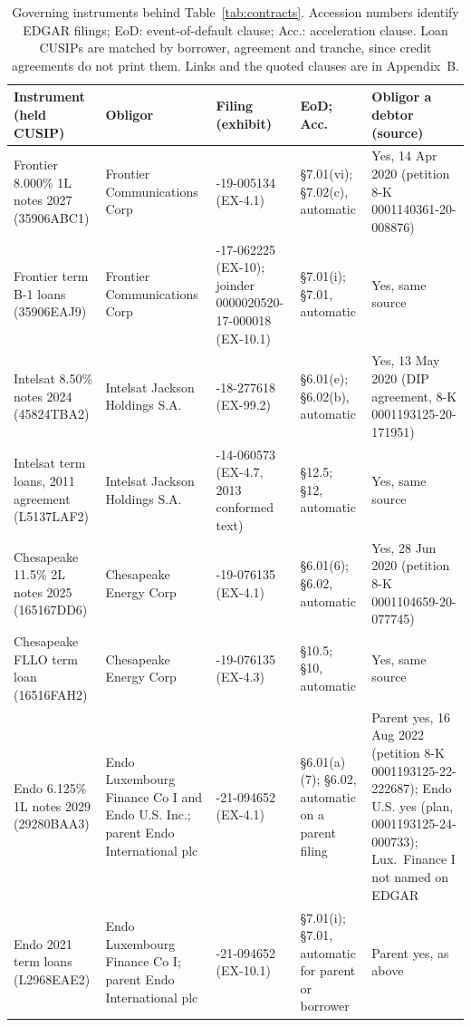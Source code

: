 \documentclass[11pt]{article}
\begin{document}
\begin{table}[H]
\centering\footnotesize
\caption{Governing instruments behind Table~\ref{tab:contracts}. Accession numbers identify EDGAR filings; EoD: event-of-default
clause; Acc.: acceleration clause. Loan CUSIPs are matched by borrower, agreement and tranche, since
credit agreements do not print them. Links and the quoted clauses are in Appendix~B.}\label{tab:sources}
\begin{tabularx}{\textwidth}{@{}>{\raggedright\arraybackslash}p{2.9cm} >{\raggedright\arraybackslash}p{2.6cm} >{\raggedright\arraybackslash}X >{\raggedright\arraybackslash}p{2.1cm} >{\raggedright\arraybackslash}X@{}}
\toprule
Instrument (held CUSIP) & Obligor & Filing (exhibit) & EoD; Acc. & Obligor a debtor (source) \\
\midrule
Frontier 8.000\% 1L notes 2027 (35906ABC1) & Frontier Communications Corp & 0001140361-19-005134 (EX-4.1) & \S7.01(vi); \S7.02(c), automatic & Yes, 14 Apr 2020 (petition 8-K 0001140361-20-008876) \\
Frontier term B-1 loans (35906EAJ9) & Frontier Communications Corp & 0001193125-17-062225 (EX-10); joinder 0000020520-17-000018 (EX-10.1) & \S7.01(i); \S7.01, automatic & Yes, same source \\
Intelsat 8.50\% notes 2024 (45824TBA2) & Intelsat Jackson Holdings S.A. & 0001193125-18-277618 (EX-99.2) & \S6.01(e); \S6.02(b), automatic & Yes, 13 May 2020 (DIP agreement, 8-K 0001193125-20-171951) \\
Intelsat term loans, 2011 agreement (L5137LAF2) & Intelsat Jackson Holdings S.A. & 0001193125-14-060573 (EX-4.7, 2013 conformed text) & \S12.5; \S12, automatic & Yes, same source \\
Chesapeake 11.5\% 2L notes 2025 (165167DD6) & Chesapeake Energy Corp & 0001104659-19-076135 (EX-4.1) & \S6.01(6); \S6.02, automatic & Yes, 28 Jun 2020 (petition 8-K 0001104659-20-077745) \\
Chesapeake FLLO term loan (16516FAH2) & Chesapeake Energy Corp & 0001104659-19-076135 (EX-4.3) & \S10.5; \S10, automatic & Yes, same source \\
Endo 6.125\% 1L notes 2029 (29280BAA3) & Endo Luxembourg Finance Co I and Endo U.S. Inc.; parent Endo International plc & 0001193125-21-094652 (EX-4.1) & \S6.01(a)(7); \S6.02, automatic on a parent filing & Parent yes, 16 Aug 2022 (petition 8-K 0001193125-22-222687); Endo U.S. yes (plan, 0001193125-24-000733); Lux.\ Finance I not named on EDGAR \\
Endo 2021 term loans (L2968EAE2) & Endo Luxembourg Finance Co I; parent Endo International plc & 0001193125-21-094652 (EX-10.1) & \S7.01(i); \S7.01, automatic for parent or borrower & Parent yes, as above \\

\end{tabularx}
\end{table}
\end{document}
